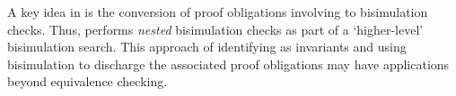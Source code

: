 A key idea in \toolName{} is the conversion of proof
obligations involving \recursiveRelations{} to
bisimulation checks. Thus, \toolName{} performs {\em nested}
bisimulation checks as part of a `higher-level'
bisimulation search. This approach of
identifying \recursiveRelations{} as invariants and using
bisimulation to discharge the associated
proof obligations may have applications
beyond equivalence checking.
